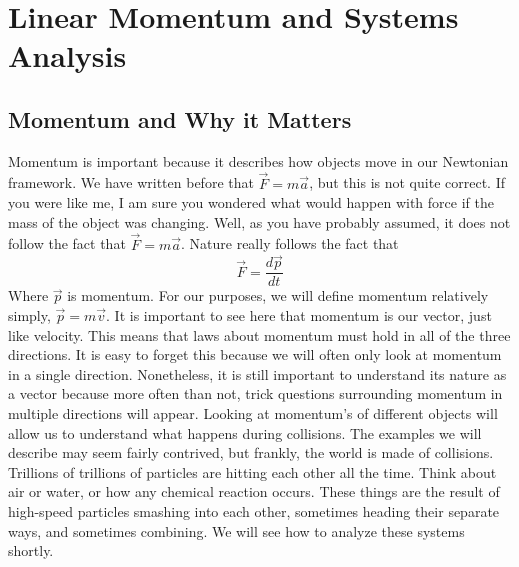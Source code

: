 \documentclass{article}[gray]
\numberwithin{equation}{subsection}
\begin{document}
\section{Linear Momentum and Systems Analysis}

\subsection{Momentum and Why it Matters}
\newline

Momentum is important because it describes how objects move in our Newtonian framework. We have written before that $\vec{F} = m\vec{a}$, but this is not quite correct. If you were like me, I am sure you wondered what would happen with force if the mass of the object was changing. Well, as you have probably assumed, it does not follow the fact that $\vec{F}=m\vec{a}$. Nature really follows the fact that \begin{equation}\vec{F}=\frac{d\vec{p}}{dt}\end{equation} Where $\vec{p}$ is momentum. For our purposes, we will define momentum relatively simply, $\vec{p}=m\vec{v}$. It is important to see here that momentum is our vector, just like velocity. This means that laws about momentum must hold in all of the three directions. It is easy to forget this because we will often only look at momentum in a single direction. Nonetheless, it is still important to understand its nature as a vector because more often than not, trick questions surrounding momentum in multiple directions will appear. Looking at momentum's of different objects will allow us to understand what happens during collisions. The examples we will describe may seem fairly contrived, but frankly, the world is made of collisions. Trillions of trillions of particles are hitting each other all the time. Think about air or water, or how any chemical reaction occurs. These things are the result of high-speed particles smashing into each other, sometimes heading their separate ways, and sometimes combining. We will see how to analyze these systems shortly. 
\end{document}
